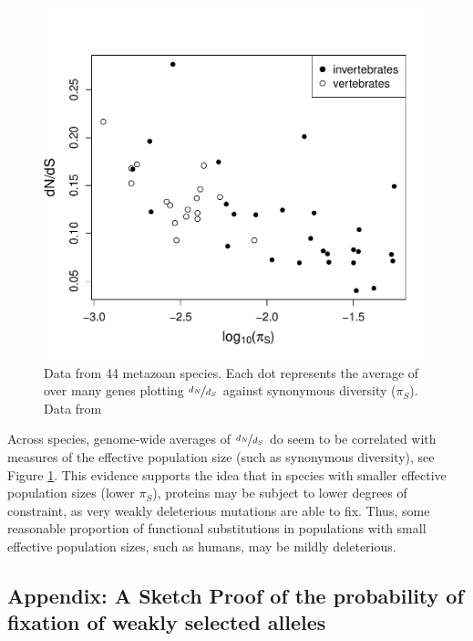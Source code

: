 {%


\begin{figure}
\begin{center}
\includegraphics[width=0.8 \textwidth]{Journal_figs/drift_selection/Galtier_dNdS/Galtier_dNdS.pdf}
\end{center}
\caption{Data from 44 metazoan species. Each dot represents the
  average of over many genes plotting $\nicefrac{d_N}{d_S}$ against synonymous
  diversity ($\pi_S$). Data from \citet{galtier2016adaptive} } \label{Galtier_dNdS}
\end{figure}

Across species, genome-wide averages of $\nicefrac{d_N}{d_S}$ do seem to be
correlated with measures of the effective population size (such as
synonymous diversity), see Figure \ref{Galtier_dNdS}. This evidence supports the idea that in species with smaller effective
population sizes (lower $\pi_S$), proteins may be subject to lower degrees of
constraint, as very weakly deleterious mutations are able to fix. Thus,
some reasonable proportion of functional substitutions in populations
with small effective population sizes, such as humans, may be mildly deleterious.

\subsection{Appendix: A Sketch Proof of the probability of fixation of
weakly selected alleles} \label{Section:fixation_weakly_sel}

}
